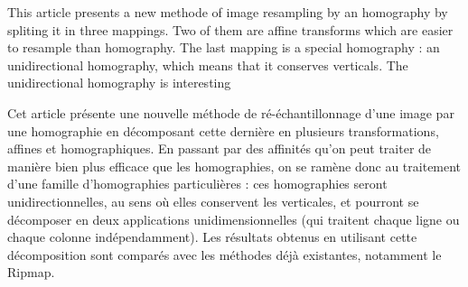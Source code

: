 This article presents a new methode of image resampling by an homography by spliting it in three mappings. Two of them are affine transforms which are easier to resample than homography. The last mapping is a special homography : an unidirectional homography, which means that it conserves verticals. The unidirectional homography is interesting  





Cet article présente une nouvelle méthode de ré-échantillonnage d'une image par une homographie en décomposant cette dernière en plusieurs transformations, affines et homographiques. En passant par des affinités qu'on peut traiter de manière bien plus efficace que les homographies, on se ramène donc au traitement d'une famille d'homographies particulières : ces homographies seront unidirectionnelles, au sens où elles conservent les verticales, et pourront se décomposer en deux applications unidimensionnelles (qui traitent chaque ligne ou chaque colonne indépendamment). Les résultats obtenus en utilisant cette décomposition sont comparés avec les méthodes déjà existantes, notamment le Ripmap.

